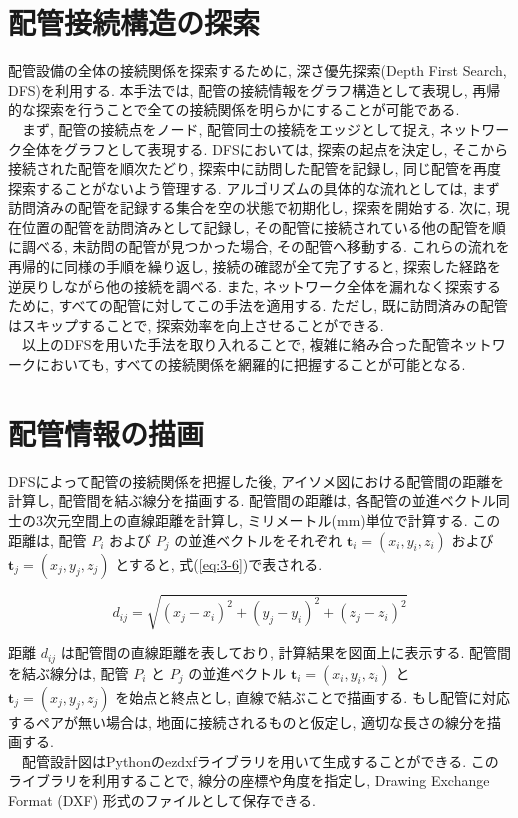 \section{配管接続構造の探索}
配管設備の全体の接続関係を探索するために, 深さ優先探索(Depth First Search, DFS)を利用する. 
本手法では, 配管の接続情報をグラフ構造として表現し, 再帰的な探索を行うことで全ての接続関係を明らかにすることが可能である. \\
　まず, 配管の接続点をノード, 配管同士の接続をエッジとして捉え, ネットワーク全体をグラフとして表現する. 
DFSにおいては, 探索の起点を決定し, そこから接続された配管を順次たどり, 探索中に訪問した配管を記録し, 同じ配管を再度探索することがないよう管理する. 
アルゴリズムの具体的な流れとしては, まず訪問済みの配管を記録する集合を空の状態で初期化し, 探索を開始する. 
次に, 現在位置の配管を訪問済みとして記録し, その配管に接続されている他の配管を順に調べる, 未訪問の配管が見つかった場合, その配管へ移動する. 
これらの流れを再帰的に同様の手順を繰り返し, 接続の確認が全て完了すると, 探索した経路を逆戻りしながら他の接続を調べる. 
また, ネットワーク全体を漏れなく探索するために, すべての配管に対してこの手法を適用する. 
ただし, 既に訪問済みの配管はスキップすることで, 探索効率を向上させることができる. \\
　以上のDFSを用いた手法を取り入れることで, 複雑に絡み合った配管ネットワークにおいても, すべての接続関係を網羅的に把握することが可能となる. 

\section{配管情報の描画}
DFSによって配管の接続関係を把握した後, アイソメ図における配管間の距離を計算し, 配管間を結ぶ線分を描画する. 
配管間の距離は, 各配管の並進ベクトル同士の3次元空間上の直線距離を計算し, ミリメートル(mm)単位で計算する. 
この距離は, 配管 $P_i$ および $P_j$ の並進ベクトルをそれぞれ $\mathbf{t}_i = (x_i, y_i, z_i)$ および $\mathbf{t}_j = (x_j, y_j, z_j)$ とすると, 式(\ref{eq:3-6})で表される. 

\begin{equation}
d_{ij} = \sqrt{(x_j - x_i)^2 + (y_j - y_i)^2 + (z_j - z_i)^2}
\label{eq:3-6}
\end{equation}

距離 $d_{ij}$ は配管間の直線距離を表しており, 計算結果を図面上に表示する. 
配管間を結ぶ線分は, 配管 $P_i$ と $P_j$ の並進ベクトル $\mathbf{t}_i = (x_i, y_i, z_i)$ と $\mathbf{t}_j = (x_j, y_j, z_j)$ を始点と終点とし, 直線で結ぶことで描画する. 
もし配管に対応するペアが無い場合は, 地面に接続されるものと仮定し, 適切な長さの線分を描画する. \\
　配管設計図はPythonのezdxfライブラリを用いて生成することができる. 
このライブラリを利用することで, 線分の座標や角度を指定し, Drawing Exchange Format (DXF) 形式のファイルとして保存できる. 
